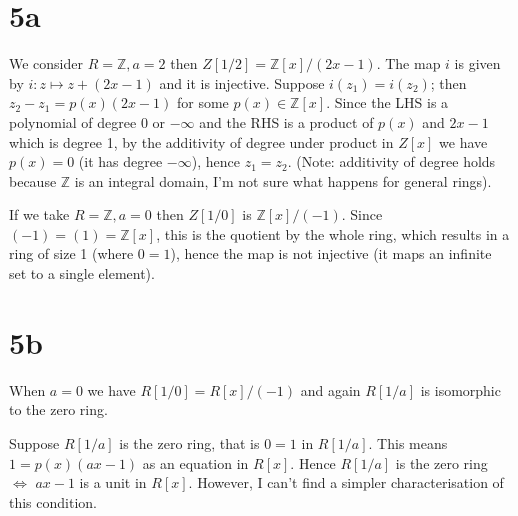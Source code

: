 \documentclass{article}
\def\Z{\mathbb{Z}}
\begin{document}
\section*{5a}

We consider $R = \Z, a = 2$ then $Z[1/2] = \Z[x]/(2x-1)$. The map $i$ is given by $i : z \mapsto z + (2x-1)$ and it is injective. Suppose $i(z_1) = i(z_2)$; then $z_2 - z_1 = p(x)(2x-1)$ for some $p(x) \in \Z[x]$. Since the LHS is a polynomial of degree $0$ or $-\infty$ and the RHS is a product of $p(x)$ and $2x-1$ which is degree 1, by the additivity of degree under product in $Z[x]$ we have $p(x) = 0$ (it has degree $-\infty$), hence $z_1 = z_2$. (Note: additivity of degree holds because $\Z$ is an integral domain, I'm not sure what happens for general rings).

If we take $R = \Z, a = 0$ then $Z[1/0]$ is $\Z[x]/(-1)$. Since $(-1) = (1) = \Z[x]$, this is the quotient by the whole ring, which results in a ring of size 1 (where $0=1$), hence the map is not injective (it maps an infinite set to a single element).

\section*{5b}

When $a = 0$ we have $R[1/0] = R[x]/(-1)$ and again $R[1/a]$ is isomorphic to the zero ring.

Suppose $R[1/a]$ is the zero ring, that is $0 = 1$ in $R[1/a]$. This means $1 = p(x)(ax-1)$ as an equation in $R[x]$. Hence $R[1/a]$ is the zero ring $\iff$ $ax-1$ is a unit in $R[x]$. However, I can't find a simpler characterisation of this condition.
\end{document}
